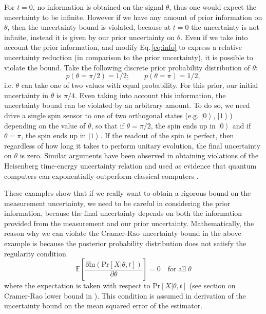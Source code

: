 \documentclass[reqno]{amsart}
\newcommand{\ket}[1]{\left| #1 \right>}
\def\8#1{\mathbb{E}\left[#1\right]}
\def\func#1#2{\mathrm{#1}\left[#2\right]}
\begin{document}
For $t = 0$, no information is obtained on the signal $\theta$, thus one would expect the uncertainty to be infinite. However if we have any amount of prior information on $\theta$, then the uncertainty bound is violated, because at $t = 0$ the uncertainty is not infinite, instead it is given by our prior uncertainty on $\theta$. Even if we take into account the prior information, and modify Eq.\,\eqref{eq:info} to express a relative uncertainty reduction (in comparison to the prior uncertainty), it is possible to violate the bound. Take the following discrete prior probability distribution of $\theta$:
\[ p(\theta = \pi/2) = 1/2; \quad \quad p(\theta = \pi) = 1/2, \]
i.e. $\theta$ can take one of two values with equal probability. For this prior, our initial uncertainty in $\theta$ is $\pi/4$. Even taking into account this information, the uncertainty bound can be violated by an arbitrary amount. To do so, we need drive a single spin sensor to one of two orthogonal states (e.g. $\ket{0}$, $\ket{1}$) depending on the value of $\theta$, so that if $\theta = \pi/2$, the spin ends up in $\ket{0}$ and if $\theta = \pi$, the spin ends up in $\ket{1}$. If the readout of the spin is perfect, then regardless of how long it takes to perform unitary evolution, the final uncertainty on $\theta$ is zero. Similar arguments have been observed in obtaining violations of the Heisenberg time-energy uncertainty relation \cite{Aharonov2002} and used as evidence that quantum computers can exponentially outperform classical computers \cite{Atia2017}.

These examples show that if we really want to obtain a rigorous bound on the measurement uncertainty, we need to be careful in considering the prior information, because the final uncertainty depends on both the information provided from the measurement and our prior uncertainty. Mathematically, the reason why we can violate the Cramer-Rao uncertainty bound in the above example is because the posterior probability distribution does not satisfy the regularity condition 
\[ \8{\frac{\partial \mathrm{ln}\left(\func{Pr}{X|\theta,t}\right)}{\partial \theta}} = 0 \quad \mathrm{for \; all}\;\theta\]
where the expectation is taken with respect to $\func{Pr}{X|\theta,t}$ (see section on Cramer-Rao lower bound in \cite{Kay1993}). This condition is assumed in derivation of the uncertainty bound on the mean squared error of the estimator.
\end{document}
